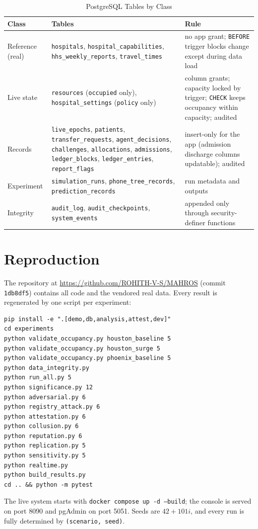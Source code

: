 \begin{table}[!h]
\centering
\caption{PostgreSQL Tables by Class}
\label{tab:schema}
\scriptsize
\setlength{\tabcolsep}{2.5pt}
\begin{tabular}{@{}p{1.25cm}p{3.35cm}p{3.05cm}@{}}
\toprule
Class & Tables & Rule \\
\midrule
Reference (real) & \texttt{hospitals}, \texttt{hospital\_capabilities}, \texttt{hhs\_weekly\_reports}, \texttt{travel\_times} & no app grant; \texttt{BEFORE} trigger blocks change except during data load \\
Live state & \texttt{resources} (\texttt{occupied} only), \texttt{hospital\_settings} (\texttt{policy} only) & column grants; capacity locked by trigger; \texttt{CHECK} keeps occupancy within capacity; audited \\
Records & \texttt{live\_epochs}, \texttt{patients}, \texttt{transfer\_requests}, \texttt{agent\_decisions}, \texttt{challenges}, \texttt{allocations}, \texttt{admissions}, \texttt{ledger\_blocks}, \texttt{ledger\_entries}, \texttt{report\_flags} & insert-only for the app (admission discharge columns updatable); audited \\
Experiment & \texttt{simulation\_runs}, \texttt{phone\_tree\_records}, \texttt{prediction\_records} & run metadata and outputs \\
Integrity & \texttt{audit\_log}, \texttt{audit\_checkpoints}, \texttt{system\_events} & appended only through security-definer functions \\
\bottomrule
\end{tabular}
\end{table}

\section{Reproduction}
\label{app:repro}
The repository at \url{https://github.com/ROHITH-V-S/MAHROS} (commit \texttt{1db8df5}) contains all code and the vendored real data. Every result is regenerated by one script per experiment:
{\footnotesize
\begin{verbatim}
pip install -e ".[demo,db,analysis,attest,dev]"
cd experiments
python validate_occupancy.py houston_baseline 5
python validate_occupancy.py houston_surge 5
python validate_occupancy.py phoenix_baseline 5
python data_integrity.py
python run_all.py 5
python significance.py 12
python adversarial.py 6
python registry_attack.py 6
python attestation.py 6
python collusion.py 6
python reputation.py 6
python replication.py 5
python sensitivity.py 5
python realtime.py
python build_results.py
cd .. && python -m pytest
\end{verbatim}
}
The live system starts with \texttt{docker compose up -d --build}; the console is served on port 8090 and pgAdmin on port 5051. Seeds are $42+101i$, and every run is fully determined by \texttt{(scenario, seed)}.

